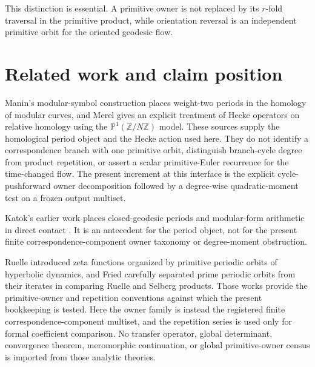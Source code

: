 \documentclass[11pt]{article}
\theoremstyle{definition}
\theoremstyle{remark}
\begin{document}
This distinction is essential. A primitive owner is not replaced by its $r$-fold traversal in the primitive product, while orientation reversal is an independent primitive orbit for the oriented geodesic flow.

\section{Related work and claim position}

Manin's modular-symbol construction places weight-two periods in the homology of modular curves, and Merel gives an explicit treatment of Hecke operators on relative homology using the $\mathbb P^1(\mathbb Z/N\mathbb Z)$ model.
\citep[Introduction and Sections~1--2]{merel1991}
These sources supply the homological period object and the Hecke action used here. They do not identify a correspondence branch with one primitive orbit, distinguish branch-cycle degree from product repetition, or assert a scalar primitive-Euler recurrence for the time-changed flow. The present increment at this interface is the explicit cycle-pushforward owner decomposition followed by a degree-wise quadratic-moment test on a frozen output multiset.

Katok's earlier work places closed-geodesic periods and modular-form arithmetic in direct contact \citep{Katok1985}. It is an antecedent for the period object, not for the present finite correspondence-component owner taxonomy or degree-moment obstruction.

Ruelle introduced zeta functions organized by primitive periodic orbits of hyperbolic dynamics, and Fried carefully separated prime periodic orbits from their iterates in comparing Ruelle and Selberg products.
\citep[Introduction and flow case]{ruelle1976}
\citep[Section~2]{fried1986}
Those works provide the primitive-owner and repetition conventions against which the present bookkeeping is tested. Here the owner family is instead the registered finite correspondence-component multiset, and the repetition series is used only for formal coefficient comparison. No transfer operator, global determinant, convergence theorem, meromorphic continuation, or global primitive-owner census is imported from those analytic theories.
\end{document}
